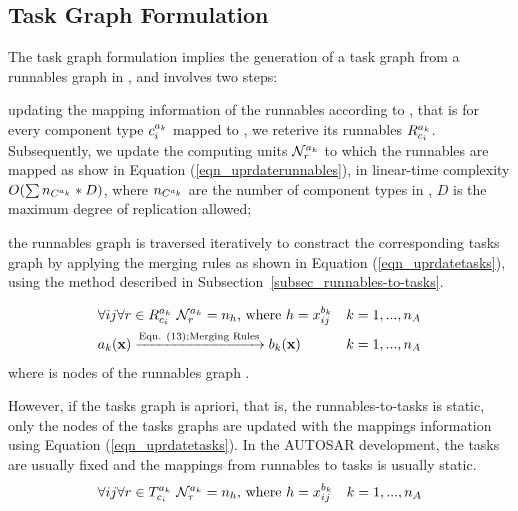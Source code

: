 \subsection{Task Graph Formulation}
The task graph formulation implies the generation of a task graph \ttat from a runnables graph \ttar in \ttx, and involves two steps: 
\begin{enumerate*}[label=(\roman*)]
	\item updating the mapping information of the runnables according to \ttx, that is for every component type $\sss{c}$ mapped to \ttx, we reterive its runnables $\sss{R}[k][c_i]$. Subsequently, we update the computing units $\sss{\mathcal{N}}[k][r]$ to which the runnables are mapped as show in Equation (\ref{eqn_uprdaterunnables}), in linear-time complexity $O(\sum n_{\ssp{C}}*D)$, where $n_{\ssp{C}}$ are the number of component types in \ttar, $D$ is the maximum degree of replication allowed;
	\item the runnables graph is traversed iteratively to constract the corresponding tasks graph by applying the merging rules as shown in Equation (\ref{eqn_uprdatetasks}), using the method described in Subsection~\ref{subsec_runnables-to-tasks}.
\end{enumerate*}
\begin{align}
\label{eqn_uprdaterunnables}
&\forall ij\forall r\in \sss{R}[k][c_i]\ \sss{\mathcal{N}}[k][r] = n_h \mbox{, where }  h=\xkij &k=1,...,n_A\\
\label{eqn_generatetasksgraphs}
& \ar(\x)\xrightarrow{\text{Eqn. (13);Merging Rules}}\at(\x) &k=1,...,n_A
\end{align}
where \ttgr{\ar} is nodes of the runnables graph \ttar.

However, if the tasks graph is apriori, that is, the runnables-to-tasks is static, only the nodes of the tasks graphs are updated with the mappings information using Equation (\ref{eqn_uprdatetasks}). In the AUTOSAR development, the tasks are usually fixed and the mappings from runnables to tasks is usually static. 
\begin{align}
	\label{eqn_uprdatetasks}
	&\forall ij\forall r\in \sss{T}[k][c_i]\ \sss{\mathcal{N}}[k][\tau] = n_h \mbox{, where }  h=\xkij &k=1,...,n_A
\end{align}

